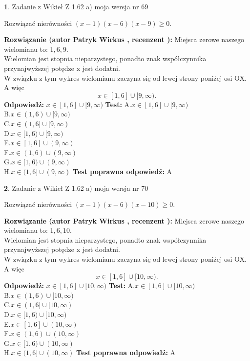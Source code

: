 \documentclass[12pt, a4paper]{article}
\theoremstyle{definition} %
\newtheorem{zad}{}
\newcommand{\zadStart}[1]{\begin{zad}#1\newline}
\newcommand{\zadStop}{\end{zad}}
\newcommand{\rozwStart}[2]{\noindent \textbf{Rozwiązanie (autor #1 , recenzent #2): }\newline}
\newcommand{\rozwStop}{\newline}
\newcommand{\odpStart}{\noindent \textbf{Odpowiedź:}\newline}
\newcommand{\odpStop}{\newline}
\newcommand{\testStart}{\noindent \textbf{Test:}\newline}
\newcommand{\testStop}{\newline}
\newcommand{\kluczStart}{\noindent \textbf{Test poprawna odpowiedź:}\newline}
\newcommand{\kluczStop}{\newline}
\begin{document}
\zadStart{Zadanie z Wikieł Z 1.62 a) moja wersja nr 69}

Rozwiązać nierówności $(x-1)(x-6)(x-9)\ge0$.
\zadStop
\rozwStart{Patryk Wirkus}{}
Miejsca zerowe naszego wielomianu to: $1, 6, 9$.\\
Wielomian jest stopnia nieparzystego, ponadto znak współczynnika przy\linebreak najwyższej potędze x jest dodatni.\\ W związku z tym wykres wielomianu zaczyna się od lewej strony poniżej osi OX. A więc $$x \in [1,6] \cup [9,\infty).$$
\rozwStop
\odpStart
$x \in [1,6] \cup [9,\infty)$
\odpStop
\testStart
A.$x \in [1,6] \cup [9,\infty)$\\
B.$x \in (1,6) \cup [9,\infty)$\\
C.$x \in (1,6] \cup [9,\infty)$\\
D.$x \in [1,6) \cup [9,\infty)$\\
E.$x \in [1,6] \cup (9,\infty)$\\
F.$x \in (1,6) \cup (9,\infty)$\\
G.$x \in [1,6) \cup (9,\infty)$\\
H.$x \in (1,6] \cup (9,\infty)$
\testStop
\kluczStart
A
\kluczStop



\zadStart{Zadanie z Wikieł Z 1.62 a) moja wersja nr 70}

Rozwiązać nierówności $(x-1)(x-6)(x-10)\ge0$.
\zadStop
\rozwStart{Patryk Wirkus}{}
Miejsca zerowe naszego wielomianu to: $1, 6, 10$.\\
Wielomian jest stopnia nieparzystego, ponadto znak współczynnika przy\linebreak najwyższej potędze x jest dodatni.\\ W związku z tym wykres wielomianu zaczyna się od lewej strony poniżej osi OX. A więc $$x \in [1,6] \cup [10,\infty).$$
\rozwStop
\odpStart
$x \in [1,6] \cup [10,\infty)$
\odpStop
\testStart
A.$x \in [1,6] \cup [10,\infty)$\\
B.$x \in (1,6) \cup [10,\infty)$\\
C.$x \in (1,6] \cup [10,\infty)$\\
D.$x \in [1,6) \cup [10,\infty)$\\
E.$x \in [1,6] \cup (10,\infty)$\\
F.$x \in (1,6) \cup (10,\infty)$\\
G.$x \in [1,6) \cup (10,\infty)$\\
H.$x \in (1,6] \cup (10,\infty)$
\testStop
\kluczStart
A
\kluczStop
\end{document}
